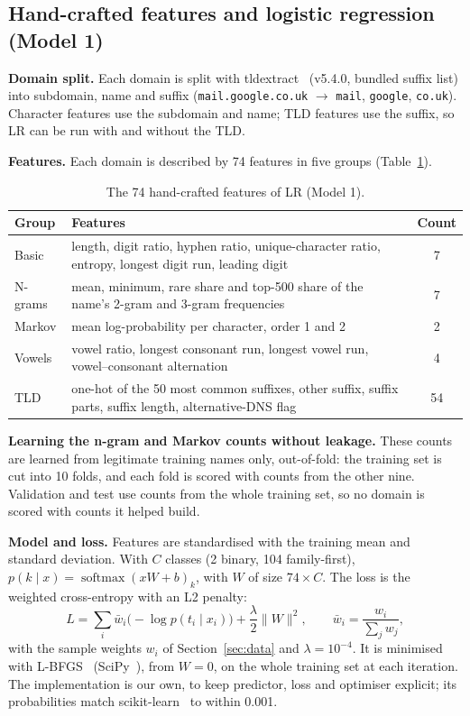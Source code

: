 \documentclass[11pt]{article}
\begin{document}
\subsection{Hand-crafted features and logistic regression (Model 1)}\label{sec:lr}
\textbf{Domain split.} Each domain is split with tldextract~\cite{kurkowski_tldextract}
(v5.4.0, bundled suffix list) into subdomain, name and suffix
(\texttt{mail.google.co.uk} $\to$ \texttt{mail}, \texttt{google}, \texttt{co.uk}).
Character features use the subdomain and name; TLD features use the suffix, so
LR can be run with and without the TLD.

\textbf{Features.} Each domain is described by 74 features in five groups
(Table~\ref{tab:features}).

\begin{table}[h]
\centering
\small
\caption{The 74 hand-crafted features of LR (Model 1).}
\label{tab:features}
\begin{tabularx}{\linewidth}{@{}l>{\raggedright\arraybackslash}Xc@{}}
\toprule
Group & Features & Count \\
\midrule
Basic & length, digit ratio, hyphen ratio, unique-character ratio, entropy, longest digit run, leading digit & 7 \\
N-grams & mean, minimum, rare share and top-500 share of the name's 2-gram and 3-gram frequencies & 7 \\
Markov & mean log-probability per character, order 1 and 2 & 2 \\
Vowels & vowel ratio, longest consonant run, longest vowel run, vowel--consonant alternation & 4 \\
TLD & one-hot of the 50 most common suffixes, other suffix, suffix parts, suffix length, alternative-DNS flag & 54 \\
\bottomrule
\end{tabularx}
\end{table}

\textbf{Learning the n-gram and Markov counts without leakage.} These counts are
learned from legitimate training names only, out-of-fold: the training set is cut
into 10 folds, and each fold is scored with counts from the other nine. Validation
and test use counts from the whole training set, so no domain is scored with
counts it helped build.

\textbf{Model and loss.} Features are standardised with the training mean and
standard deviation. With $C$ classes (2 binary, 104 family-first),
$p(k \mid x) = \operatorname{softmax}(xW + b)_k$, with $W$ of size $74 \times C$.
The loss is the weighted cross-entropy with an L2 penalty:
\begin{equation}
L = \sum_{i} \bar{w}_i \big(-\log p(t_i \mid x_i)\big) + \frac{\lambda}{2}\lVert W \rVert^2,
\qquad \bar{w}_i = \frac{w_i}{\sum_j w_j},
\label{eq:lrloss}
\end{equation}
with the sample weights $w_i$ of Section~\ref{sec:data} and $\lambda = 10^{-4}$. It is
minimised with L-BFGS~\cite{liu1989lbfgs} (SciPy~\cite{virtanen2020scipy}), from
$W = 0$, on the whole training set at each iteration. The implementation is our
own, to keep predictor, loss and optimiser explicit; its probabilities match
scikit-learn~\cite{pedregosa2011sklearn} to within 0.001.
\end{document}
